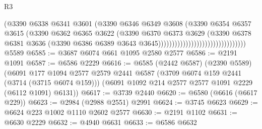 \begin{lexlean}{R3}
\begin{coremodule}
                                                      (@3390
                                                        @6338
                                                        @6341
                                                        @3601
                                                        (@3390
                                                          @6346
                                                          @6349
                                                          @3608
                                                          (@3390
                                                            @6354
                                                            @6357
                                                            @3615
                                                            (@3390
                                                              @6362
                                                              @6365
                                                              @3622
                                                              (@3390
                                                                @6370
                                                                @6373
                                                                @3629
                                                                (@3390
                                                                  @6378
                                                                  @6381
                                                                  @3636
                                                                  (@3390
                                                                    @6386
                                                                    @6389
                                                                    @3643
                                                                    @3645))))))))))))))))))))))))))))))))
    @5589
@6585 := @3687 @6074 @661 @1095 @2580 @2577
@6586 := @2191 @1091
@6587 := @6586 @2229
@6616 := @6585
    (@2442 @6587)
    (@2390 @5589)
    (@6091
      @177
      @1094
      @2577
      @2579
      @2441
      @6587
      (@3709 @6074 @159 @2441 (@3714 (@3715 @6074 @159)))
      (@6091 @1092 @214 @2577 @2577 @1091 @2229 (@6112 @1091) @6131))
@6617 := @3739 @2440
@6620 := @6580 (@6616 (@6617 @229))
@6623 := @2984 (@2988 @2551) @2991
@6624 := @3745 @6623
@6629 := @6624 @223 @1002 @1110 @2602 @2577
@6630 := @2191 @1102
@6631 := @6630 @2229
@6632 := @4940 @6631
@6633 := @6586 @6632

\end{coremodule}
\end{lexlean}
